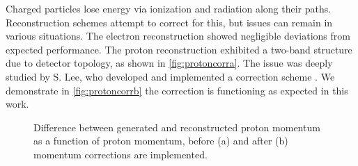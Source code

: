 Charged particles lose energy via ionization and radiation along their paths. Reconstruction schemes attempt to correct for this, but issues can remain in various situations. The electron reconstruction showed negligible deviations from expected performance. The proton reconstruction exhibited a two-band structure due to detector topology, as shown in \ref{fig:protoncorra}. The issue was deeply studied by S. Lee, who developed and implemented a correction scheme \parencite{Lee2022MeasurementDetector}. We demonstrate in \ref{fig:protoncorrb} the correction is functioning as expected in this work. 


    \begin{figure}[H]
        \centering
        
        \hfill
    
        \caption[Proton Momentum Correction]{Difference between generated and reconstructed proton momentum as a function of proton momentum, before (a) and after (b) momentum corrections are implemented.}\label{fig:protoncorr}
    \end{figure}

